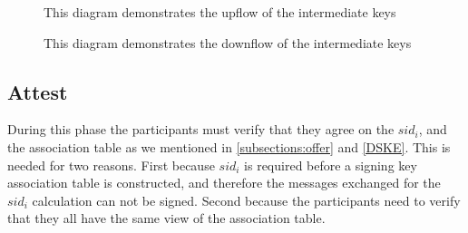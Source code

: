 \begin{figure}[H]
  \begin{minipage}{0.49\textwidth}
    \caption{This diagram demonstrates the upflow of the intermediate keys}
  \end{minipage}
  \begin{minipage}{0.49\textwidth}
    \caption{This diagram demonstrates the downflow of the intermediate keys}
  \end{minipage}
\end{figure}

\subsection{Attest}
\label{subsections:attest}
During this phase the participants must verify that they agree on the $sid_i$,
and the association table as we mentioned in \ref{subsections:offer} and \ref{DSKE}.
This is needed for two reasons. First because $sid_i$ is required before a signing key association table is constructed, and therefore the messages exchanged for the $sid_i$ calculation can not be signed. Second because the participants need to verify that they all have the same view of the association table.

